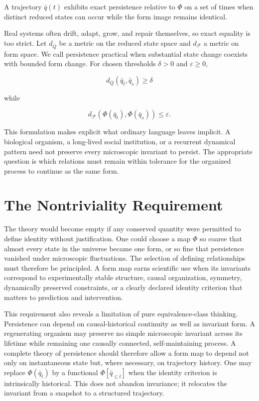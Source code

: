 \begin{definition}
A trajectory $\bar q(t)$ exhibits exact persistence relative to $\Phi$ on a set of times when distinct reduced states can occur while the form image remains identical.
\end{definition}

Real systems often drift, adapt, grow, and repair themselves, so exact equality is too strict. Let $d_{\bar Q}$ be a metric on the reduced state space and $d_{\mathcal F}$ a metric on form space. We call persistence practical when substantial state change coexists with bounded form change. For chosen thresholds $\delta>0$ and $\varepsilon\ge0$,

\[
d_{\bar Q}(\bar q_t,\bar q_s)\ge \delta
\]

while

\[
d_{\mathcal F}\!\left(\Phi(\bar q_t),\Phi(\bar q_s)\right)\le \varepsilon.
\]

This formulation makes explicit what ordinary language leaves implicit. A biological organism, a long-lived social institution, or a recurrent dynamical pattern need not preserve every microscopic invariant to persist. The appropriate question is which relations must remain within tolerance for the organized process to continue as the same form.

\section{The Nontriviality Requirement}

The theory would become empty if any conserved quantity were permitted to define identity without justification. One could choose a map $\Phi$ so coarse that almost every state in the universe became one form, or so fine that persistence vanished under microscopic fluctuations. The selection of defining relationships must therefore be principled. A form map earns scientific use when its invariants correspond to experimentally stable structure, causal organization, symmetry, dynamically preserved constraints, or a clearly declared identity criterion that matters to prediction and intervention.

This requirement also reveals a limitation of pure equivalence-class thinking. Persistence can depend on causal-historical continuity as well as invariant form. A regenerating organism may preserve no simple microscopic invariant across its lifetime while remaining one causally connected, self-maintaining process. A complete theory of persistence should therefore allow a form map to depend not only on instantaneous state but, where necessary, on trajectory history. One may replace $\Phi(\bar q_t)$ by a functional $\Phi[\bar q_{\le t}]$ when the identity criterion is intrinsically historical. This does not abandon invariance; it relocates the invariant from a snapshot to a structured trajectory.

